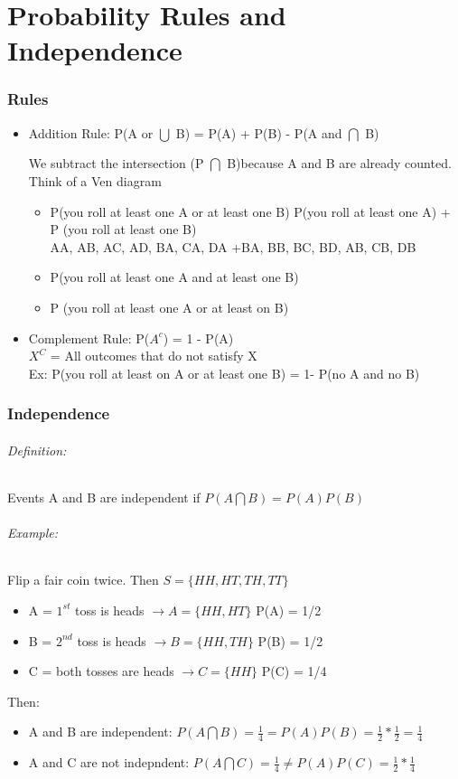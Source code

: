 \documentclass[11pt]{article}
\begin{document}
    \part[Probability Rules and Independence]{Probability Rules and Independence}
    \section[Rules]{Rules}
    \begin{itemize}
        \item Addition Rule: P(A or $\bigcup$ B) = P(A) + P(B) - P(A and $\bigcap$ B)

        We subtract the intersection (P $\bigcap$ B)because A and B are already counted.
        Think of a Ven diagram
        \begin{itemize}
            \item P(you roll at least one A or at least one B)
            \subitem P(you roll at least one A) + P (you roll at least one B)
            \\ AA, AB, AC, AD, BA, CA, DA +BA, BB, BC, BD, AB, CB, DB
            \item P(you roll at least one A and at least one B)
            \item P (you roll at least one A or at least on B)
        \end{itemize}
        \item Complement Rule: P($A^c$) = 1 - P(A) \\
        $X^C$ = All outcomes that do not satisfy X
        \\
        Ex: P(you roll at least on A or at least one B) = 1- P(no A and no B)
    \end{itemize}
    \section[Independence]{Independence}
    \paragraph[Definition]{Definition: } Events A and B are independent if
    $P(A\bigcap B) = P(A)P(B)$
    \paragraph[Example]{Example: }Flip a fair coin twice. Then
    $S = \{HH, HT, TH, TT\}$
    \begin{itemize}
        \item A = $1^{st}$ toss is heads $\to A= \{HH, HT\}$ P(A) = 1/2
        \item B = $2^{nd}$ toss is heads $\to B= \{HH, TH\}$ P(B) = 1/2
        \item C = both tosses are heads $\to C= \{HH\}$ P(C) = 1/4
    \end{itemize}
    Then:
    \begin{itemize}
        \item A and B are independent:
        $P(A\bigcap B) = \frac{1}{4} = P(A)P(B) = \frac{1}{2}* \frac{1}{2} = \frac{1}{4}$
        \item A and C are not indepndent:
        $P(A\bigcap C) = \frac{1}{4} \neq P(A)P(C) = \frac{1}{2} * \frac{1}{4}$
    \end{itemize}
\end{document}
